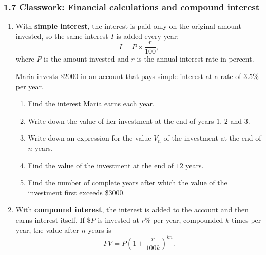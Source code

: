 \documentclass[12pt, twoside]{article}
\begin{document}
\subsubsection*{1.7 Classwork: Financial calculations and compound interest}

\begin{enumerate}[itemsep=0.15cm]

\item[1.]

With \textbf{simple interest}, the interest is paid only on the original
amount invested, so the same interest $I$ is added every year:
$$I = P \times \frac{r}{100},$$
where $P$ is the amount invested and $r$ is the annual interest rate
in percent.

Maria invests \$$2000$ in an account that pays simple interest at a
rate of $3.5\%$ per year.

\begin{enumerate}[itemsep=0.1cm]
  \item Find the interest Maria earns each year.
  \item Write down the value of her investment at the end of years
  $1$, $2$ and $3$.
  \item Write down an expression for the value $V_{n}$ of the
  investment at the end of $n$ years.
  \item Find the value of the investment at the end of $12$ years.
  \item Find the number of complete years after which the value of
  the investment first exceeds \$$3000$.
\end{enumerate}


\newpage

\item[2.]

With \textbf{compound interest}, the interest is added to the account
and then earns interest itself. If \$$P$ is invested at $r\%$ per year,
compounded $k$ times per year, the value after $n$ years is
$$FV = P\left(1 + \frac{r}{100k}\right)^{kn}.$$


\end{enumerate}
\end{document}
